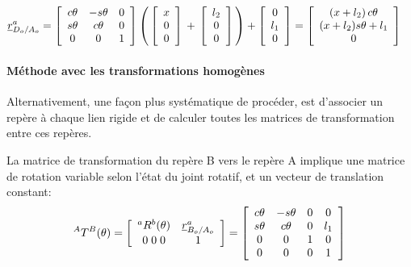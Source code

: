 \begin{align}
\underline{r}_{D_o/A_o}^a &=  \left[ \begin{array}{c c c}
	c\theta & -s\theta & 0 \\
	s\theta & c\theta & 0 \\
	0 & 0 & 1 
\end{array}  \right] \left( \, \left[ \begin{array}{c} 
x \\ 0 \\ 0
\end{array} \right]  \, + \, \left[ \begin{array}{c} 
l_2 \\ 0 \\ 0
\end{array} \right]   \,  \right) + \left[ \begin{array}{c} 
0 \\ l_1 \\ 0
\end{array} \right] = 
\left[ \begin{array}{c} 
( x + l_2 ) \, c\theta \\ ( x + l_2 ) s\theta  + l_1 \\ 0
\end{array} \right] 
\end{align} 




\paragraph{Méthode avec les transformations homogènes}

Alternativement, une façon plus systématique de procéder, est d'associer un repère à chaque lien rigide et de calculer toutes les matrices de transformation entre ces repères. 

La matrice de transformation du repère B vers le repère A implique une matrice de rotation variable selon l'état du joint rotatif, et un vecteur de translation constant:
\begin{align}
^AT^B(\theta) 
= 
\left[ \begin{array}{c c } 
^aR^b(\theta)  & \underline{r}_{B_o/A_o}^a \\ 0 \; 0 \; 0 & 1
\end{array} \right]  = 
\left[ \begin{array}{c c c c} 
  c\theta & -s\theta & 0 & 0  \\
	s\theta & c\theta  & 0 & l_1  \\
	0 & 0 & 1              & 0  \\ 
	0 & 0 & 0              & 1
\end{array} \right]
\end{align} 

